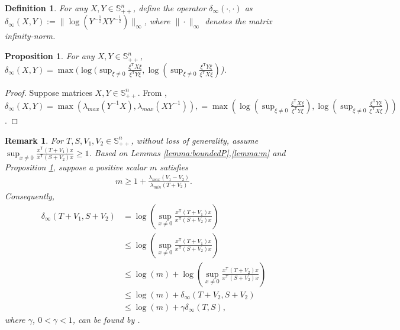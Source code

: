 \documentclass[letterpaper, 10 pt, conference]{ieeeconf}  %
\newcommand{\transpose}{\mathsf{T}}
\newcommand{\quadinner}[1]{x^{\transpose}(#1)x}
\newtheorem{definition}{Definition}
\newtheorem{proposition}{Proposition}
\newtheorem{remark}{Remark}
\begin{document}
\begin{definition}
    For any $X,Y\in \mathbb{S}_{++}^{n}$, define the operator $\delta_{\infty}(\cdot, \cdot)$ as
  $ \delta_{\infty}(X, Y) := \| \log(Y^{-\frac{1}{2}}XY^{-\frac{1}{2}})\|_{\infty}$, where $\|\cdot\|_{\infty}$ denotes the matrix infinity-norm.
\end{definition}

\begin{proposition}\label{proposition:deltaRatio}
    For any $X,Y\in \mathbb{S}_{++}^{n}$,
$ \delta_{\infty}(X,Y) = \max(\log(\sup_{\xi\neq0} \frac{\xi^{\transpose}X\xi}{\xi^{\transpose}Y\xi},\log(\sup_{\xi\neq0} \frac{\xi^{\transpose}Y\xi}{\xi^{\transpose}X\xi})$).
\end{proposition}
\begin{proof}
    Suppose matrices $X,Y\in\mathbb{S}_{++}^{n}$. From \cite[Remark 2.2.]{lee_invariant_2008}, $\delta_{\infty}(X,Y) = \max(\lambda_{max}(Y^{-1}X),\lambda_{max}(XY^{-1})), = \max(\log(\sup_{\xi\neq0} \frac{\xi^{\transpose}X\xi}{\xi^{\transpose}Y\xi}),\log(\sup_{\xi\neq0} \frac{\xi^{\transpose}Y\xi}{\xi^{\transpose}X\xi}))$.
\end{proof}

\begin{remark}\label{remark:delta}
    For $T,S,V_{1},V_{2}\in \mathbb{S}_{++}^{n}$, without loss of generality, assume
    $\sup_{x\neq 0} \frac{\quadinner{T+V_{1}}}{\quadinner{S+V_{2}}} \geq 1$.
    Based on Lemmas \ref{lemma:boundedP},\ref{lemma:m} and Proposition \ref{proposition:deltaRatio}, suppose a positive scalar $m$ satisfies
    \begin{align*}
        m \geq 1+\frac{\lambda_{max}(V_{1}-V_{2})}{\lambda_{min}(T+V_{2})}.
    \end{align*}
   Consequently, 
    \begin{align*}
        \delta_{\infty}(T+V_{1},S+V_{2}) &= \log( \sup_{x\neq 0} \frac{\quadinner{T+V_{1}}}{\quadinner{S+V_{2}}})\\
        &\leq \log(\sup_{x\neq 0} \frac{\quadinner{T+V_{1}}}{\quadinner{S+V_{2}}})\\
        &\leq \log(m)+\log(\sup_{x\neq 0} \frac{\quadinner{T+V_{2}}}{\quadinner{S+V_{2}}})\\
        &\leq \log(m) + \delta_{\infty}(T+V_{2},S+V_{2})\\
        &\leq \log(m) + \gamma\delta_{\infty}(T,S),
    \end{align*}
    where $\gamma$, $0<\gamma<1$, can be found by \cite[Lemma D.2]{krauth_finite-time_2019}.
\end{remark}
\end{document}

